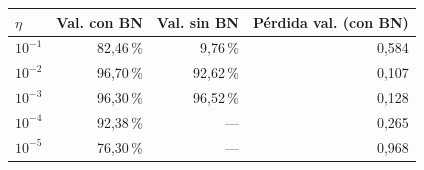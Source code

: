 \begin{tabular}{lrrr}
\toprule
$\eta$ & Val. con BN & Val. sin BN & Pérdida val. (con BN) \\
\midrule
$10^{-1}$ & 82,46\,\% & 9,76\,\% & 0,584 \\
$10^{-2}$ & 96,70\,\% & 92,62\,\% & 0,107 \\
$10^{-3}$ & 96,30\,\% & 96,52\,\% & 0,128 \\
$10^{-4}$ & 92,38\,\% & --- & 0,265 \\
$10^{-5}$ & 76,30\,\% & --- & 0,968 \\
\bottomrule
\end{tabular}
